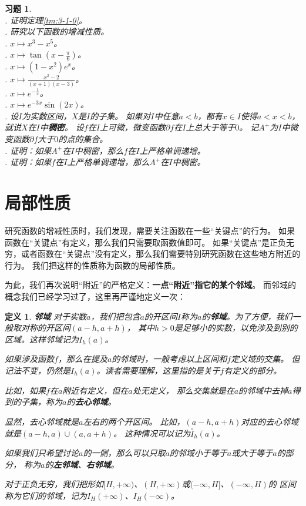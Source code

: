 \documentclass[12pt,UTF8]{ctexbook}
\newtheorem{df}{定义}[section]
\newtheorem{xt}{习题}[section]
\begin{document}
\begin{xt}
    \mbox{} \\
    . 证明定理\ref{tm:3-1-0}。\\
    . 研究以下函数的增减性质。\\
    . $x\mapsto x^3 - x^5$。\\
    . $x\mapsto \tan{\left(x - \frac{\pi}{6}\right)}$。\\
    . $x\mapsto (1 - x^2) e^x$。\\
    . $x\mapsto \frac{x^2 - 2}{(x + 1)(x - 3)}$。\\
    . $x\mapsto e^{-\frac{1}{x}}$。\\
    . $x\mapsto e^{-3x} \sin{(2x)}$。\\
    . 设$I$为实数区间，$X$是$I$的子集。
    如果对$I$中任意$a < b$，都有$x\in I$使得$a<x<b$，就说$X$在$I$中\textbf{稠密}。
    设$f$在$I$上可微，微变函数$\partial f$在$I$上总大于等于$0$。
    记$A^+$为$I$中微变函数$\partial f$大于$0$的点的集合。\\
    . 证明：如果$A^+$在$I$中稠密，那么$f$在$I$上严格单调递增。\\
    . 证明：如果$f$在$I$上严格单调递增，那么$A^+$在$I$中稠密。
    
\end{xt}


 \section{局部性质}

研究函数的增减性质时，我们发现，需要关注函数在一些“关键点”的行为。
如果函数在“关键点”有定义，那么我们只需要取函数值即可。
如果“关键点”是正负无穷，或者函数在“关键点”没有定义，那么我们需要特别研究函数在这些地方附近的行为。
我们把这样的性质称为函数的局部性质。

为此，我们再次说明“附近”的严格定义：\textbf{一点“附近”指它的某个邻域}。
而邻域的概念我们已经学习过了，这里再严谨地定义一次：
\begin{df}{\textbf{邻域}}
    对于实数$a$，我们把包含$a$的开区间$I$称为$a$的\textbf{邻域}。为了方便，我们一般取对称的开区间$(a-h, a+h)$，
    其中$h>0$是足够小的实数，以免涉及到别的区域。这样邻域记为$I_h(a)$。

    如果涉及函数$f$，那么在提及$a$的邻域时，一般考虑以上区间和$f$定义域的交集。
    但记法不变，仍然是$I_h(a)$。读者需要理解，这里指的是关于$f$有定义的部分。

    比如，如果$f$在$a$附近有定义，但在$a$处无定义，
    那么交集就是在$a$的邻域中去掉$a$得到的子集，称为$a$的\textbf{去心邻域}。

    显然，去心邻域就是$a$左右的两个开区间。
    比如，$(a-h, a+h)$对应的去心邻域就是$(a-h, a)\cup(a, a+h)$。
    这种情况可以记为$\overset{\circ}{I}_h(a)$。

    如果我们只希望讨论$a$的一侧，那么可以只取$a$的邻域小于等于$a$或大于等于$a$的部分，
    称为$a$的\textbf{左邻域}、\textbf{右邻域}。

    对于正负无穷，我们把形如$[H, +\infty)$、$(H, +\infty)$或$(-\infty, H]$、$(-\infty, H)$的
    区间称为它们的邻域，记为$I_H(+\infty)$、$I_H(-\infty)$。
\end{df}
\end{document}
